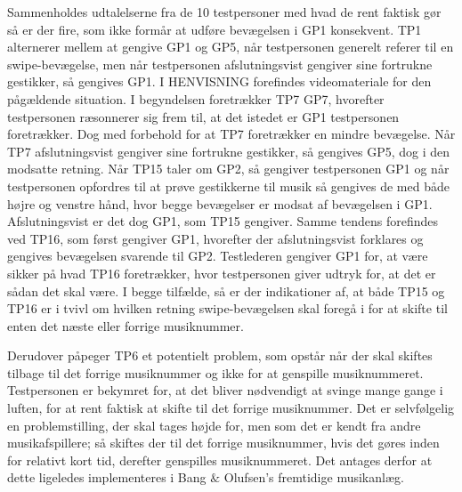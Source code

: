 Sammenholdes udtalelserne fra de 10 testpersoner med hvad de rent faktisk gør så er der fire, som ikke formår at udføre bevægelsen i GP1 konsekvent. TP1 alternerer mellem at gengive GP1 og GP5, når testpersonen generelt referer til en swipe-bevægelse, men når testpersonen afslutningsvist gengiver sine fortrukne gestikker, så gengives GP1. I HENVISNING forefindes videomateriale for den pågældende situation. I begyndelsen foretrækker TP7 GP7, hvorefter testpersonen ræsonnerer sig frem til, at det istedet er GP1 testpersonen foretrækker. Dog med forbehold for at TP7 foretrækker en mindre bevægelse. Når TP7 afslutningsvist gengiver sine fortrukne gestikker, så gengives GP5, dog i den modsatte retning. Når TP15 taler om GP2, så gengiver testpersonen GP1 og når testpersonen opfordres til at prøve gestikkerne til musik så gengives de med både højre og venstre hånd, hvor begge bevægelser er modsat af bevægelsen i GP1. Afslutningsvist er det dog GP1, som TP15 gengiver. Samme tendens forefindes ved TP16, som først gengiver GP1, hvorefter der afslutningsvist forklares og gengives bevægelsen svarende til GP2. Testlederen gengiver GP1 for, at være sikker på hvad TP16 foretrækker, hvor testpersonen giver udtryk for, at det er sådan det skal være. I begge tilfælde, så er der indikationer af, at både TP15 og TP16 er i tvivl om hvilken retning swipe-bevægelsen skal foregå i for at skifte til enten det næste eller forrige musiknummer.

Derudover påpeger TP6 et potentielt problem, som opstår når der skal skiftes tilbage til det forrige musiknummer og ikke for at genspille musiknummeret. Testpersonen er bekymret for, at det bliver nødvendigt at svinge mange gange i luften, for at rent faktisk at skifte til det forrige musiknummer. Det er selvfølgelig en problemstilling, der skal tages højde for, men som det er kendt fra andre musikafspillere; så skiftes der til det forrige musiknummer, hvis det gøres inden for relativt kort tid, derefter genspilles musiknummeret. Det antages derfor at dette ligeledes implementeres i Bang $\&$ Olufsen's fremtidige musikanlæg. 
%
